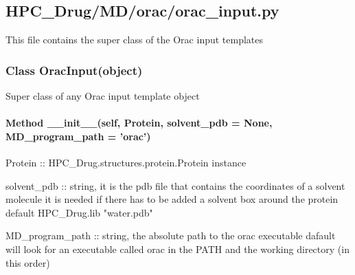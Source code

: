 


\subsection{HPC\_Drug/MD/orac/orac\_input.py}

    This file contains the super class of the Orac input templates

    \subsubsection{Class OracInput(object)}

        Super class of any Orac input template object

        \paragraph{Method \_\_init\_\_(self, Protein, solvent\_pdb = None, MD\_program\_path = 'orac')}

            Protein :: HPC\_Drug.structures.protein.Protein instance

            solvent\_pdb :: string, it is the pdb file that contains the coordinates of a solvent molecule 
            it is needed if there has to be added a solvent box around the protein 
            default HPC\_Drug.lib "water.pdb"

            MD\_program\_path :: string, the absolute path to the orac executable 
            dafault will look for an executable called orac in the PATH and the working directory (in this order)


